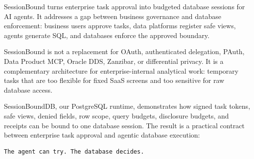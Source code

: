 \documentclass[
]{article}
\begin{document}
SessionBound turns enterprise task approval into budgeted database
sessions for AI agents. It addresses a gap between business governance
and database enforcement: business users approve tasks, data platforms
register safe views, agents generate SQL, and databases enforce the
approved boundary.

SessionBound is not a replacement for OAuth, authenticated delegation,
PAuth, Data Product MCP, Oracle DDS, Zanzibar, or differential privacy.
It is a complementary architecture for enterprise-internal analytical
work: temporary tasks that are too flexible for fixed SaaS screens and
too sensitive for raw database access.

SessionBoundDB, our PostgreSQL runtime, demonstrates how signed task
tokens, safe views, denied fields, row scope, query budgets, disclosure
budgets, and receipts can be bound to one database session. The result
is a practical contract between enterprise task approval and agentic
database execution:

\begin{verbatim}
The agent can try. The database decides.
\end{verbatim}



\end{document}
